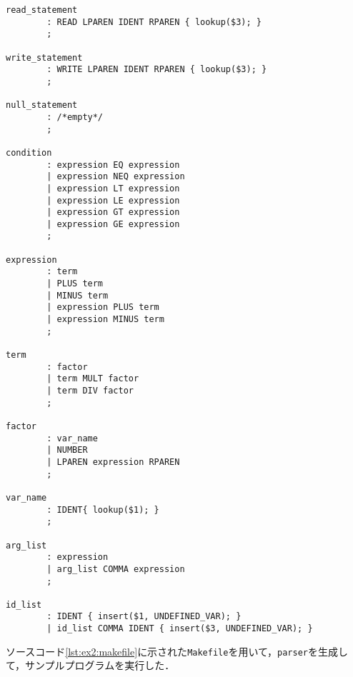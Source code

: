 \documentclass[uplatex]{jsarticle}
\begin{document}
\begin{lstlisting}[caption=parser.y,label=lst:ex3:parser.y]
read_statement
        : READ LPAREN IDENT RPAREN { lookup($3); }
        ;

write_statement
        : WRITE LPAREN IDENT RPAREN { lookup($3); }
        ;

null_statement
        : /*empty*/
        ;

condition
        : expression EQ expression
        | expression NEQ expression
        | expression LT expression
        | expression LE expression
        | expression GT expression
        | expression GE expression
        ;

expression
        : term
        | PLUS term
        | MINUS term
        | expression PLUS term
        | expression MINUS term
        ;

term
        : factor
        | term MULT factor
        | term DIV factor
        ;

factor
        : var_name
        | NUMBER
        | LPAREN expression RPAREN
        ;

var_name
        : IDENT{ lookup($1); }
        ;

arg_list
        : expression
        | arg_list COMMA expression
        ;

id_list
        : IDENT { insert($1, UNDEFINED_VAR); }
        | id_list COMMA IDENT { insert($3, UNDEFINED_VAR); }

\end{lstlisting}
ソースコード\ref{lst:ex2:makefile}に示された\verb#Makefile#を用いて，\verb#parser#を生成して，サンプルプログラムを実行した．
\end{document}
